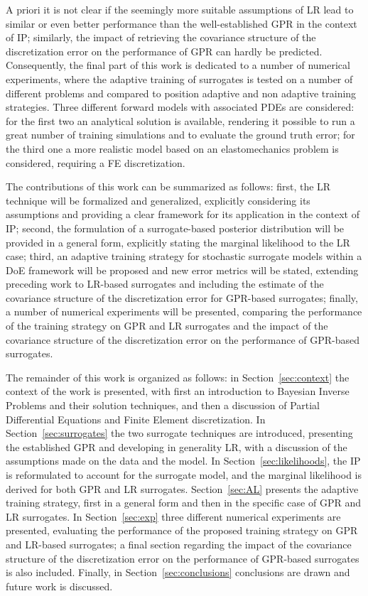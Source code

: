 A priori it is not clear if the seemingly more suitable assumptions of LR lead to similar or even better performance than the well-established GPR in the context of IP; similarly, the impact of retrieving the covariance structure of the discretization error on the performance of GPR can hardly be predicted.
Consequently, the final part of this work is dedicated to a number of numerical experiments, where the adaptive training of surrogates is tested on a number of different problems and compared to position adaptive and non adaptive training strategies.
Three different forward models with associated PDEs are considered: for the first two an analytical solution is available, rendering it possible to run a great number of training simulations and to evaluate the ground truth error; for the third one a more realistic model based on an elastomechanics problem is considered, requiring a FE discretization.\medskip

The contributions of this work can be summarized as follows: first, the LR technique will be formalized and generalized, explicitly considering its assumptions and providing a clear framework for its application in the context of IP; second, the formulation of a surrogate-based posterior distribution will be provided in a general form, explicitly stating the marginal likelihood to the LR case; third, an adaptive training strategy for stochastic surrogate models within a DoE framework will be proposed and new error metrics will be stated, extending preceding work to LR-based surrogates and including the estimate of the covariance structure of the discretization error for GPR-based surrogates; finally, a number of numerical experiments will be presented, comparing the performance of the training strategy on GPR and LR surrogates and the impact of the covariance structure of the discretization error on the performance of GPR-based surrogates.\medskip

The remainder of this work is organized as follows: in Section~\ref{sec:context} the context of the work is presented, with first an introduction to Bayesian Inverse Problems and their solution techniques, and then a discussion of Partial Differential Equations and Finite Element discretization.
In Section~\ref{sec:surrogates} the two surrogate techniques are introduced, presenting the established GPR and developing in generality LR, with a discussion of the assumptions made on the data and the model.
In Section~\ref{sec:likelihoods}, the IP is reformulated to account for the surrogate model, and the marginal likelihood is derived for both GPR and LR surrogates.
Section~\ref{sec:AL} presents the adaptive training strategy, first in a general form and then in the specific case of GPR and LR surrogates.
In Section~\ref{sec:exp} three different numerical experiments are presented, evaluating the performance of the proposed training strategy on GPR and LR-based surrogates; a final section regarding the impact of the covariance structure of the discretization error on the performance of GPR-based surrogates is also included.
Finally, in Section~\ref{sec:conclusions} conclusions are drawn and future work is discussed.

